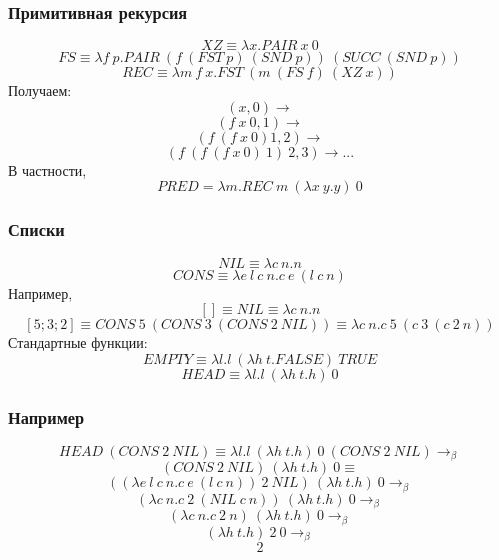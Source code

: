 \documentclass[xetex,mathserif,serif]{beamer}
\begin{document}
    \begin{frame}
        \frametitle{Примитивная рекурсия}
        $$XZ \equiv \lambda x.PAIR\ x\ 0$$
        $$FS \equiv \lambda f\ p.PAIR\ (f\ (FST\ p)\ (SND\ p))\ (SUCC\ (SND\ p))$$
        $$REC \equiv \lambda m\ f\ x.FST\ (m\ (FS\ f)\ (XZ\ x))$$
        Получаем:
        $$(x, 0) \rightarrow$$
        $$(f\ x\ 0, 1) \rightarrow$$
        $$(f\ (f\ x\ 0) 1, 2) \rightarrow$$
        $$(f\ (f\ (f\ x\ 0)\ 1)\ 2, 3) \rightarrow ...$$
        В частности, 
        $$PRED = \lambda m.REC\ m\ (\lambda x\ y.y)\ 0$$
    \end{frame}

    \begin{frame}
        \frametitle{Списки}
        $$NIL \equiv \lambda c\ n.n$$
        $$CONS \equiv \lambda e\ l\ c\ n.c\ e\ (l\ c\ n)$$
        Например,
        $$[] \equiv NIL \equiv \lambda c\ n.n$$
        $$[5; 3; 2] \equiv CONS\ 5\ (CONS\ 3\ (CONS\ 2\ NIL)) \equiv \lambda c\ n.c\ 5\ (c\ 3\ (c\ 2\ n))$$
        Стандартные функции:
        $$EMPTY \equiv \lambda l.l\ (\lambda h\ t.FALSE)\ TRUE$$
        $$HEAD \equiv \lambda l.l\ (\lambda h\ t.h)\ 0$$
    \end{frame}

    \begin{frame}
        \frametitle{Например}
        $$HEAD\ (CONS\ 2\ NIL) \equiv \lambda l.l\ (\lambda h\ t.h)\ 0\ (CONS\ 2\ NIL) \rightarrow_\beta$$
        $$    (CONS\ 2\ NIL)\ (\lambda h\ t.h)\ 0 \equiv$$
        $$    ((\lambda e\ l\ c\ n.c\ e\ (l\ c\ n))\ 2\ NIL)\ (\lambda h\ t.h)\ 0 \rightarrow_\beta$$
        $$    (\lambda c\ n.c\ 2\ (NIL\ c\ n))\ (\lambda h\ t.h)\ 0 \rightarrow_\beta$$
        $$    (\lambda c\ n.c\ 2\ n)\ (\lambda h\ t.h)\ 0 \rightarrow_\beta$$
        $$    (\lambda h\ t.h)\ 2\ 0 \rightarrow_\beta$$
        $$    2$$
    \end{frame}
\end{document}
